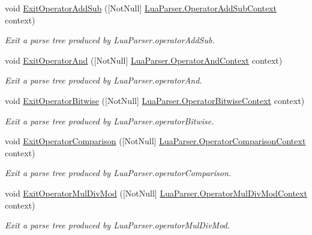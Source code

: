 \begin{DoxyCompactItemize}
void \mbox{\hyperlink{classzlua_1_1_compiler_a1559fa97735e564dc0cc25c6c5ec355a}{Exit\+Operator\+Add\+Sub}} (\mbox{[}Not\+Null\mbox{]} \mbox{\hyperlink{classzlua_1_1_lua_parser_1_1_operator_add_sub_context}{Lua\+Parser.\+Operator\+Add\+Sub\+Context}} context)
\begin{DoxyCompactList}\small\item\em Exit a parse tree produced by Lua\+Parser.\+operator\+Add\+Sub. \end{DoxyCompactList}\item 
void \mbox{\hyperlink{classzlua_1_1_compiler_a57e026e3b4f6ec40d78cc9f4c8068ad3}{Exit\+Operator\+And}} (\mbox{[}Not\+Null\mbox{]} \mbox{\hyperlink{classzlua_1_1_lua_parser_1_1_operator_and_context}{Lua\+Parser.\+Operator\+And\+Context}} context)
\begin{DoxyCompactList}\small\item\em Exit a parse tree produced by Lua\+Parser.\+operator\+And. \end{DoxyCompactList}\item 
void \mbox{\hyperlink{classzlua_1_1_compiler_ac96911516696a03a45807348f6338b41}{Exit\+Operator\+Bitwise}} (\mbox{[}Not\+Null\mbox{]} \mbox{\hyperlink{classzlua_1_1_lua_parser_1_1_operator_bitwise_context}{Lua\+Parser.\+Operator\+Bitwise\+Context}} context)
\begin{DoxyCompactList}\small\item\em Exit a parse tree produced by Lua\+Parser.\+operator\+Bitwise. \end{DoxyCompactList}\item 
void \mbox{\hyperlink{classzlua_1_1_compiler_af08a21dc48be4131cee4560b260d09c2}{Exit\+Operator\+Comparison}} (\mbox{[}Not\+Null\mbox{]} \mbox{\hyperlink{classzlua_1_1_lua_parser_1_1_operator_comparison_context}{Lua\+Parser.\+Operator\+Comparison\+Context}} context)
\begin{DoxyCompactList}\small\item\em Exit a parse tree produced by Lua\+Parser.\+operator\+Comparison. \end{DoxyCompactList}\item 
void \mbox{\hyperlink{classzlua_1_1_compiler_ab995afb210e4d04b7ebdcdd62f8f1541}{Exit\+Operator\+Mul\+Div\+Mod}} (\mbox{[}Not\+Null\mbox{]} \mbox{\hyperlink{classzlua_1_1_lua_parser_1_1_operator_mul_div_mod_context}{Lua\+Parser.\+Operator\+Mul\+Div\+Mod\+Context}} context)
\begin{DoxyCompactList}\small\item\em Exit a parse tree produced by Lua\+Parser.\+operator\+Mul\+Div\+Mod. \end{DoxyCompactList}\item 

\end{DoxyCompactItemize}
